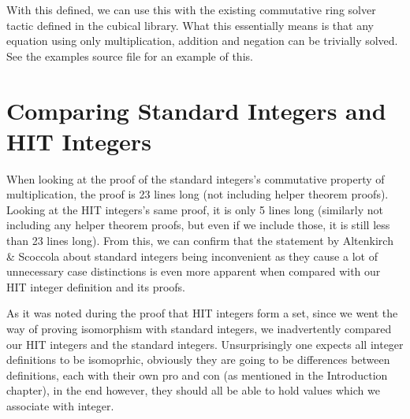 With this defined, we can use this with the existing commutative ring solver tactic defined in the cubical library. What this essentially means is that any equation using only multiplication, addition and negation can be trivially solved. See the examples source file for an example of this.

\section{Comparing Standard Integers and HIT Integers}
When looking at the proof of the standard integers's commutative property of multiplication, the proof is 23 lines long (not including helper theorem proofs). Looking at the HIT integers's same proof, it is only 5 lines long (similarly not including any helper theorem proofs, but even if we include those, it is still less than 23 lines long). From this, we can confirm that the statement by Altenkirch \& Scoccola about standard integers being inconvenient as they cause a lot of unnecessary case distinctions is even more apparent when compared with our HIT integer definition and its proofs.

As it was noted during the proof that HIT integers form a set, since we went the way of proving isomorphism with standard integers, we inadvertently compared our HIT integers and the standard integers. Unsurprisingly one expects all integer definitions to be isomoprhic, obviously they are going to be differences between definitions, each with their own pro and con (as mentioned in the Introduction chapter), in the end however, they should all be able to hold values which we associate with integer.
